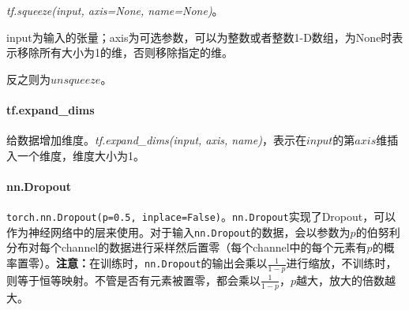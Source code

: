 \textit{tf.squeeze(input, axis=None, name=None)}。

input为输入的张量；axis为可选参数，可以为整数或者整数1-D数组，为None时表示移除所有大小为1的维，否则移除指定的维。

反之则为$unsqueeze$。

\paragraph{tf.expand\_dims}给数据增加维度。\textit{tf.expand\_dims(input, axis, name)}，表示在$input$的第$axis$维插入一个维度，维度大小为1。

\paragraph{nn.Dropout}
\texttt{torch.nn.Dropout(p=0.5, inplace=False)}。\texttt{nn.Dropout}实现了Dropout，可以作为神经网络中的层来使用。对于输入\texttt{nn.Dropout}的数据，会以参数为$p$的伯努利分布对每个channel的数据进行采样然后置零（每个channel中的每个元素有$p$的概率置零）。\textbf{注意：}在训练时，\texttt{nn.Dropout}的输出会乘以$\frac{1}{1 - p}$进行缩放，不训练时，则等于恒等映射。不管是否有元素被置零，都会乘以$\frac{1}{1 - p}$，$p$越大，放大的倍数越大。